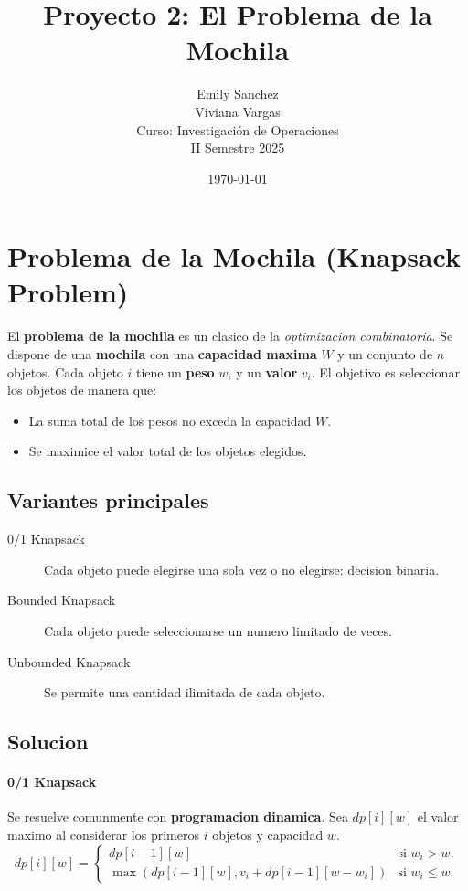 \documentclass{article}
\title{Proyecto 2: El Problema de la Mochila}
\author{Emily Sanchez \\ Viviana Vargas \\[1cm] Curso: Investigación de Operaciones \\ II Semestre 2025}
\date{\today}
\begin{document}
\maketitle

\thispagestyle{empty}
\newpage
\setcounter{page}{1}

\section{Problema de la Mochila (Knapsack Problem)}

El \textbf{problema de la mochila} es un clasico de la \textit{optimizacion combinatoria}. Se dispone de una \textbf{mochila} con una \textbf{capacidad maxima} $W$ y un conjunto de $n$ objetos. Cada objeto $i$ tiene un \textbf{peso} $w_i$ y un \textbf{valor} $v_i$. El objetivo es seleccionar los objetos de manera que:
\begin{itemize}
  \item La suma total de los pesos no exceda la capacidad $W$.
  \item Se maximice el valor total de los objetos elegidos.
\end{itemize}

\subsection{Variantes principales}
\begin{description}
  \item[0/1 Knapsack] Cada objeto puede elegirse una sola vez o no elegirse: decision binaria.
  \item[Bounded Knapsack] Cada objeto puede seleccionarse un numero limitado de veces.
  \item[Unbounded Knapsack] Se permite una cantidad ilimitada de cada objeto.
\end{description}

\subsection{Solucion}
\paragraph{0/1 Knapsack} Se resuelve comunmente con \textbf{programacion dinamica}. Sea $dp[i][w]$ el valor maximo al considerar los primeros $i$ objetos y capacidad $w$.
\[
dp[i][w] =
\begin{cases}
dp[i-1][w] & \text{si } w_i > w, \\
\max ( dp[i-1][w], v_i + dp[i-1][w - w_i] ) & \text{si } w_i \le w.
\end{cases}
\]
\end{document}
